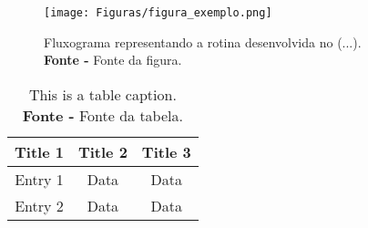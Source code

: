 
\begin{figure}[H]
    \centering
    \texttt{[image: Figuras/figura\_exemplo.png]}
    \caption{Fluxograma representando a rotina desenvolvida no (...).\\\textbf{Fonte -} Fonte da figura.}
    \label{fluxograma_N}
\end{figure}

%
%
%
%

\begin{table}[]
\centering
\begin{tabular}{@{}ccc@{}}
\toprule
\textbf{Title 1} & \textbf{Title 2} & \textbf{Title 3} \\ \midrule
Entry 1          & Data             & Data             \\
Entry 2          & Data             & Data             \\ \bottomrule
\end{tabular}
\caption{This is a table caption. \\ \textbf{Fonte -} Fonte da tabela.}
\label{tab:my-table}
\end{table}



